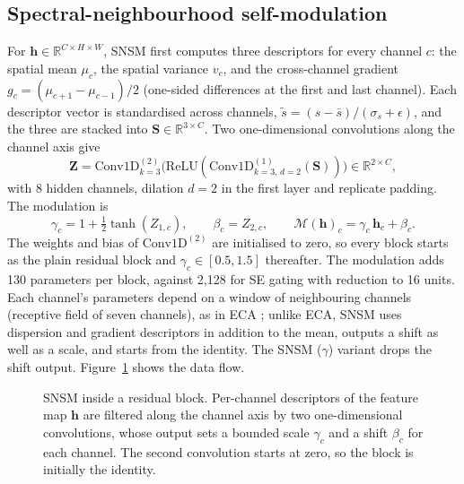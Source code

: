 \documentclass[]{interact}
\begin{document}
\subsection{Spectral-neighbourhood self-modulation}
For $\mathbf{h}\in\mathbb{R}^{C\times H\times W}$, SNSM first computes three descriptors for every channel $c$: the spatial mean $\mu_c$, the spatial variance $v_c$, and the cross-channel gradient $g_c=(\mu_{c+1}-\mu_{c-1})/2$ (one-sided differences at the first and last channel). Each descriptor vector is standardised across channels, $\tilde{s}=(s-\bar{s})/(\sigma_s+\epsilon)$, and the three are stacked into $\mathbf{S}\in\mathbb{R}^{3\times C}$. Two one-dimensional convolutions along the channel axis give
\begin{equation}
\mathbf{Z}=\mathrm{Conv1D}^{(2)}_{k=3}\big(\mathrm{ReLU}(\mathrm{Conv1D}^{(1)}_{k=3,\,d=2}(\mathbf{S}))\big)\in\mathbb{R}^{2\times C},
\end{equation}
with 8 hidden channels, dilation $d=2$ in the first layer and replicate padding. The modulation is
\begin{equation}
\gamma_c=1+\tfrac12\tanh(Z_{1,c}),\qquad \beta_c=Z_{2,c},\qquad \mathcal{M}(\mathbf{h})_c=\gamma_c\,\mathbf{h}_c+\beta_c .
\end{equation}
The weights and bias of $\mathrm{Conv1D}^{(2)}$ are initialised to zero, so every block starts as the plain residual block and $\gamma_c\in[0.5,1.5]$ thereafter. The modulation adds 130 parameters per block, against 2{,}128 for SE gating with reduction to 16 units. Each channel's parameters depend on a window of neighbouring channels (receptive field of seven channels), as in ECA \citep{wang2020eca}; unlike ECA, SNSM uses dispersion and gradient descriptors in addition to the mean, outputs a shift as well as a scale, and starts from the identity. The SNSM ($\gamma$) variant drops the shift output. Figure~\ref{fig:block} shows the data flow.

\begin{figure}[t]
\centering
\resizebox{\textwidth}{!}{}
\caption{SNSM inside a residual block. Per-channel descriptors of the feature map $\mathbf{h}$ are filtered along the channel axis by two one-dimensional convolutions, whose output sets a bounded scale $\gamma_c$ and a shift $\beta_c$ for each channel. The second convolution starts at zero, so the block is initially the identity.}
\label{fig:block}
\end{figure}
\end{document}
